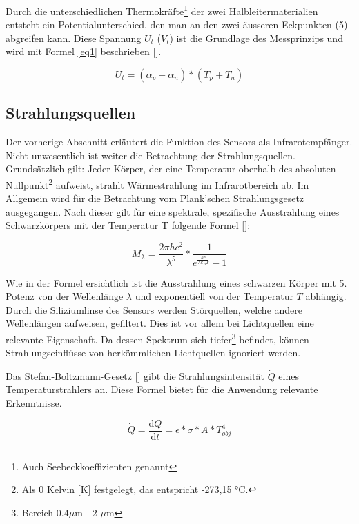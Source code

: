 Durch die unterschiedlichen Thermokräfte\footnote[3]{Auch Seebeckkoeffizienten genannt} der zwei Halbleitermaterialien entsteht ein Potentialunterschied, den man an den zwei äusseren Eckpunkten (5) abgreifen kann. Diese Spannung $U_{t}$ ($V_{t}$) ist die Grundlage des Messprinzips und wird mit Formel \ref{eq1} beschrieben [\protect\cite{AMG8834}].

\begin{equation}
\label{eq1}
U_{t} = (\alpha_{p} + \alpha_{n})*(T_{p}+T_{n})
\end{equation}

\subsection{Strahlungsquellen}
\label{subsec:Strahlungstheorie}
Der vorherige Abschnitt erläutert die Funktion des Sensors als Infrarotempfänger. Nicht unwesentlich ist weiter die Betrachtung der Strahlungsquellen. Grundsätzlich gilt: Jeder Körper, der eine Temperatur oberhalb des absoluten Nullpunkt\footnote[4]{Als 0 Kelvin [K] festgelegt, das entspricht -273,15 °C.} aufweist, strahlt Wärmestrahlung im Infrarotbereich ab. Im Allgemein wird für die Betrachtung vom Plank'schen Strahlungsgesetz ausgegangen. Nach dieser gilt für eine spektrale, spezifische Ausstrahlung eines Schwarzkörpers mit der Temperatur T folgende Formel [\protect\cite{Thermoformeln}]: 

\begin{equation}
\label{eq2}
M_{\lambda } = \frac{2\pi h c^2 }{\lambda^5}*\frac{1}{e^\frac{hc}{\lambda k_{B} T}-1}
\end{equation}

Wie in der Formel ersichtlich ist die Ausstrahlung eines schwarzen Körper mit 5. Potenz von der Wellenlänge $\lambda$ und exponentiell von der Temperatur $T$ abhängig. Durch die Siliziumlinse des Sensors werden Störquellen, welche andere Wellenlängen aufweisen, gefiltert. Dies ist vor allem bei Lichtquellen eine relevante Eigenschaft. Da dessen Spektrum sich tiefer\footnote[5]{Bereich 0.4$ \mu$m - 2 $\mu$m} befindet, können Strahlungseinflüsse von herkömmlichen Lichtquellen ignoriert werden.

Das Stefan-Boltzmann-Gesetz [\protect\cite{Thermoformeln}] gibt die Strahlungsintensität $\dot{Q}$ eines Temperaturstrahlers an. Diese Formel bietet für die Anwendung relevante Erkenntnisse.

\begin{equation}
\label{eq3}
\dot{Q} = \frac{\mathrm{d} Q}{\mathrm{d} t} = \epsilon *\sigma * A * T_{obj}^4
\end{equation}

